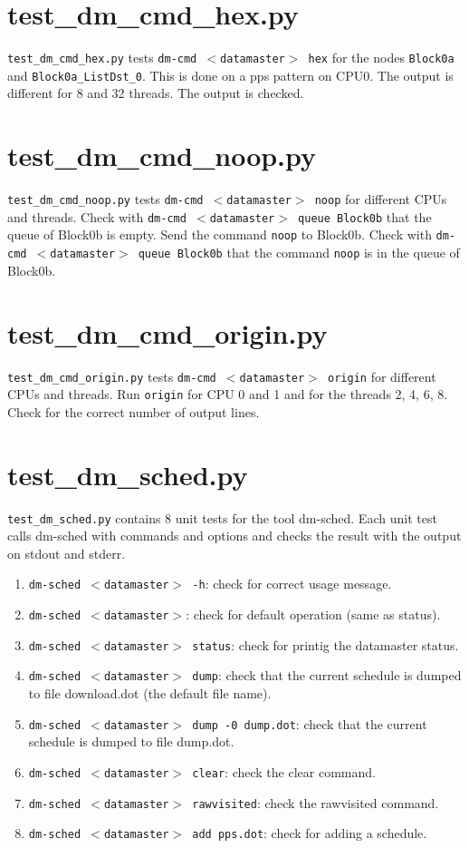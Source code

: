 \documentclass[12pt,a4paper]{report}
\begin{document}
\section{test\_dm\_cmd\_hex.py}
\texttt{test\_dm\_cmd\_hex.py} tests \texttt{dm-cmd $<$datamaster$>$ hex}
for the nodes \texttt{Block0a} and \texttt{Block0a\_ListDst\_0}. This
is done on a pps pattern on CPU0. The output is different for 8 and 32 threads.
The output is checked.

\section{test\_dm\_cmd\_noop.py}
\texttt{test\_dm\_cmd\_noop.py} tests \texttt{dm-cmd $<$datamaster$>$ noop} for different CPUs and threads.
Check with \texttt{dm-cmd $<$datamaster$>$ queue Block0b} that the queue of Block0b is empty.
Send the command \texttt{noop} to Block0b. Check with \texttt{dm-cmd $<$datamaster$>$ queue Block0b}
that the command \texttt{noop} is in the queue of Block0b.

\section{test\_dm\_cmd\_origin.py}
\texttt{test\_dm\_cmd\_origin.py} tests \texttt{dm-cmd $<$datamaster$>$ origin} for different CPUs and threads.
Run \texttt{origin} for CPU 0 and 1 and for the threads 2, 4, 6, 8.
Check for the correct number of output lines.

\section{test\_dm\_sched.py}
\texttt{test\_dm\_sched.py} contains 8 unit tests for the tool dm-sched. Each unit test calls dm-sched
with commands and options and checks the result with the output on stdout and stderr.

\begin{enumerate}
\item \texttt{dm-sched $<$datamaster$>$ -h}: check for correct usage message.
\item \texttt{dm-sched $<$datamaster$>$}: check for default operation (same as status).
\item \texttt{dm-sched $<$datamaster$>$ status}: check for printig the datamaster status.
\item \texttt{dm-sched $<$datamaster$>$ dump}: check that the current schedule is dumped to file download.dot (the default file name).
\item \texttt{dm-sched $<$datamaster$>$ dump -0 dump.dot}: check that the current schedule is dumped to file dump.dot.
\item \texttt{dm-sched $<$datamaster$>$ clear}: check the clear command.
\item \texttt{dm-sched $<$datamaster$>$ rawvisited}: check the rawvisited command.
\item \texttt{dm-sched $<$datamaster$>$ add pps.dot}: check for adding a schedule.
\end{enumerate}
\end{document}
